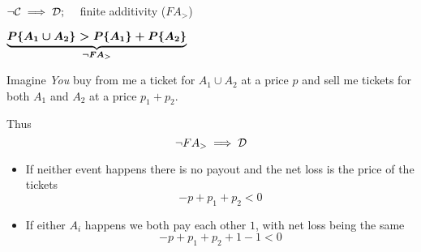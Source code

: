 \begin{frame}{$\neg\mathcal{C}\implies\mathcal{D};\quad$ finite additivity ($FA_>$)}


\begin{minipage}[]{0.45\linewidth}
\begin{minipage}[]{\linewidth}
{$\bm{\underbrace{P\{A_1\cup A_2\}>P\{A_1\}+P\{A_2\}}_{\neg FA_>}}$}
\bigskip

Imagine \emph{You} buy from me a ticket for $A_1\cup A_2$ at a price $p$ and sell me tickets for both $A_1$ and $A_2$ at a price $p_1+p_2$. 
\end{minipage}
\vfill
\bigskip
\begin{minipage}[]{\linewidth}
Thus
$$\neg FA_>\implies \mathcal{D}$$
\end{minipage}
\end{minipage}
\hfill
\begin{minipage}[]{0.45\linewidth}
\begin{itemize}\itemsep1.2em
\item If neither event happens there is no payout and the net loss is the price of the tickets
$$-p+p_1+p_2<0$$

\item If either $A_i$ happens we both pay each other $1$, with net loss being the same
$$-p+p_1+p_2+1-1<0$$

\end{itemize}
\end{minipage}

\end{frame}

